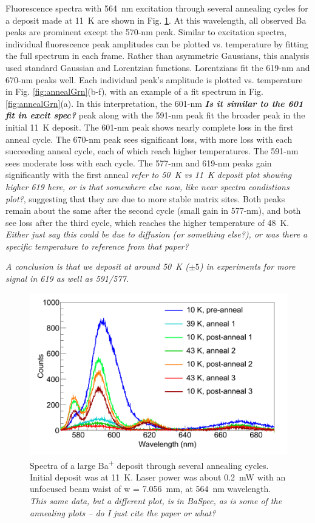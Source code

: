 Fluorescence spectra with 564~nm excitation through several annealing cycles for a deposit made at 11~K are shown in Fig. \ref{fig:specAnneal}.  At this wavelength, all observed Ba peaks are prominent except the 570-nm peak.  Similar to excitation spectra, individual fluorescence peak amplitudes can be plotted vs. temperature by fitting the full spectrum in each frame.  Rather than asymmetric Gaussians, this analysis used standard Gaussian and Lorentzian functions.  Lorentzians fit the 619-nm and 670-nm peaks well.  Each individual peak's amplitude is plotted vs. temperature in Fig. \ref{fig:annealGrn}(b-f), with an example of a fit spectrum in Fig. \ref{fig:annealGrn}(a).  In this interpretation, the 601-nm \emph{\textbf{\color{red}Is it similar to the 601 fit in excit spec?}} peak along with the 591-nm peak fit the broader peak in the initial 11~K deposit.  The 601-nm peak shows nearly complete loss in the first anneal cycle.  The 670-nm peak sees significant loss, with more loss with each succeeding anneal cycle, each of which reach higher temperatures.  The 591-nm sees moderate loss with each cycle.  The 577-nm and 619-nm peaks gain significantly with the first anneal \emph{\color{gray}refer to 50~K vs 11~K deposit plot showing higher 619 here, or is that somewhere else now, like near spectra condistions plot?}, suggesting that they are due to more stable matrix sites.  Both peaks remain about the same after the second cycle (small gain in 577-nm), and both see loss after the third cycle, which reaches the higher temperature of 48~K. \emph{\color{gray}Either just say this could be due to diffusion (or something else?), or was there a specific temperature to reference from that paper?}

\emph{\color{gray}A conclusion is that we deposit at around 50~K ($\pm 5$) in experiments for more signal in 619 as well as 591/577.}

\begin{figure} %
        \centering
                \includegraphics[width=.95\textwidth]{figures/spectra_annealing.png}
                \caption{Spectra of a large Ba\textsuperscript{+} deposit through several annealing cycles.  Initial deposit was at 11~K.  Laser power was about 0.2~mW with an unfocused beam waist of w = 7.056~mm, at 564~nm wavelength.  \emph{\color{red}This same data, but a different plot, is in BaSpec, as is some of the annealing plots -- do I just cite the paper or what?}}
\label{fig:specAnneal}
\end{figure}

